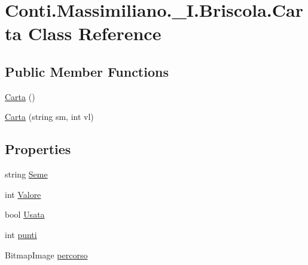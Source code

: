 \hypertarget{class_conti_1_1_massimiliano_1_1__5_i_1_1_briscola_1_1_carta}{}\section{Conti.\+Massimiliano.\+\_\+I.\+Briscola.\+Carta Class Reference}
\label{class_conti_1_1_massimiliano_1_1__5_i_1_1_briscola_1_1_carta}
\subsection*{Public Member Functions}
\begin{DoxyCompactItemize}
\item 
\hyperlink{class_conti_1_1_massimiliano_1_1__5_i_1_1_briscola_1_1_carta_a398eb93c05ff826b596e5c8dc37e5fc6}{Carta} ()
\item 
\hyperlink{class_conti_1_1_massimiliano_1_1__5_i_1_1_briscola_1_1_carta_a54051d98cf9c1acd72f1125310ba3cf6}{Carta} (string sm, int vl)
\end{DoxyCompactItemize}
\subsection*{Properties}
\begin{DoxyCompactItemize}
\item 
string \hyperlink{class_conti_1_1_massimiliano_1_1__5_i_1_1_briscola_1_1_carta_a742f5a2176e22c8550100b98bbbf265b}{Seme}
\item 
int \hyperlink{class_conti_1_1_massimiliano_1_1__5_i_1_1_briscola_1_1_carta_aa8d7102545896d6787425afe8ba38410}{Valore}
\item 
bool \hyperlink{class_conti_1_1_massimiliano_1_1__5_i_1_1_briscola_1_1_carta_ae3a4512c09eae0e33d1fa3397b0d0854}{Usata}
\item 
int \hyperlink{class_conti_1_1_massimiliano_1_1__5_i_1_1_briscola_1_1_carta_a981be65d4a041ea1fc8c1c107657e355}{punti}
\item 
Bitmap\+Image \hyperlink{class_conti_1_1_massimiliano_1_1__5_i_1_1_briscola_1_1_carta_a1320bde230f47bb50e716058ae0d11e9}{percorso}
\end{DoxyCompactItemize}


